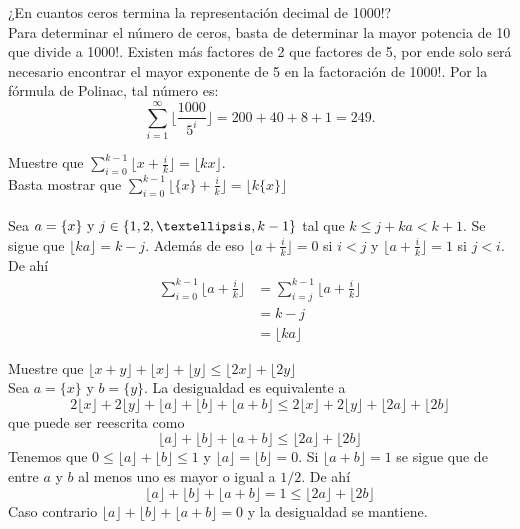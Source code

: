	\begin{ej}
		¿En cuantos ceros termina la representaci\'on decimal de 1000!?\\
		
		Para determinar el n\'umero de ceros, basta de determinar la mayor potencia de 10 que divide a 1000!. Existen m\'as factores de 2 que factores de 5, por ende solo ser\'a necesario encontrar el mayor exponente de 5 en la factoraci\'on de 1000!. Por la f\'ormula de Polinac, tal n\'umero es: 
		$$\sum_{i = 1}^{\infty} \biggl\lfloor\frac{1000}{5^{i}}\biggr\rfloor = 200 + 40 + 8 + 1 = 249.$$
	\end{ej}
	\begin{ej}
		Muestre que $\displaystyle\sum_{i = 0}^{k - 1}\biggl\lfloor x + \frac{i}{k}\biggr\rfloor = \lfloor kx \rfloor.$\\
		Basta mostrar que $\displaystyle\sum_{i = 0}^{k - 1}\biggl\lfloor \{x\} + \frac{i}{k}\biggr\rfloor = \lfloor k\{x\} \rfloor$\\ \\
		Sea $a = \{x\} \text{ y } j \in \{1,2,\textellipsis, k-1\}$ tal que $k \leq j + ka < k + 1.$ Se sigue que $\lfloor ka \rfloor = k - j$. Adem\'as de eso $\biggl\lfloor a + \frac{i}{k}\biggr\rfloor = 0$ si $i < j$ y $\biggl\lfloor a + \frac{i}{k}\biggr\rfloor = 1$ si $j < i$. De ah\'i
		\begin{align*}
			\sum_{i = 0}^{k - 1}\biggl\lfloor a + \frac{i}{k}\biggr\rfloor &= \sum_{i = j}^{k - 1}\biggl\lfloor a + \frac{i}{k}\biggr\rfloor \\
			&= k - j \\
			&= \lfloor ka \rfloor		
		\end{align*}		 		
	\end{ej}
	\begin{ej}
		Muestre que $\lfloor x + y \rfloor + \lfloor x \rfloor + \lfloor y \rfloor \leq \lfloor 2x \rfloor + \lfloor 2y \rfloor$\\
		
		Sea $a = \{x\} \text{ y } b = \{y\}$. La desigualdad es equivalente a 
		$$2\lfloor x \rfloor + 2\lfloor y \rfloor + \lfloor a \rfloor + \lfloor b \rfloor + \lfloor a + b \rfloor \leq 2\lfloor x \rfloor + 2\lfloor y \rfloor + \lfloor 2a \rfloor + \lfloor 2b \rfloor$$
		que puede ser reescrita como
		$$\lfloor a \rfloor + \lfloor b \rfloor + \lfloor a + b \rfloor \leq \lfloor 2a \rfloor + \lfloor 2b \rfloor$$
		Tenemos que $0 \leq \lfloor a \rfloor + \lfloor b \rfloor \leq 1$ y $\lfloor a \rfloor = \lfloor b \rfloor = 0$. Si $\lfloor a+ b \rfloor = 1$ se sigue que de entre $a$ y $b$ al menos uno es mayor o igual a $1/2$. De ah\'i
		$$\lfloor a \rfloor + \lfloor b \rfloor + \lfloor a + b \rfloor = 1 \leq \lfloor 2a \rfloor + \lfloor 2b \rfloor$$
		Caso contrario $\lfloor a \rfloor + \lfloor b \rfloor + \lfloor a + b \rfloor = 0$ y la desigualdad se mantiene.
	\end{ej}
